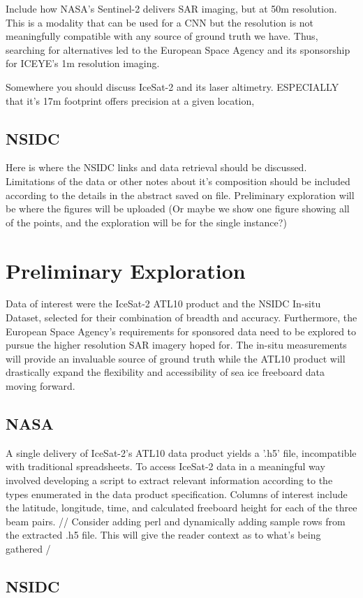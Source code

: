 Include how NASA's Sentinel-2 delivers SAR imaging, but at 50m resolution. This is a modality that can be used for a CNN but the resolution is not meaningfully compatible with any source of ground truth we have. Thus, searching for alternatives led to the European Space Agency and its sponsorship for ICEYE's 1m resolution imaging.

Somewhere you should discuss IceSat-2 and its laser altimetry. ESPECIALLY that it's 17m footprint offers precision at a given location, 
\subsection*{NSIDC}
Here is where the NSIDC links and data retrieval should be discussed. Limitations of the data or other notes about it's composition should be included according to the details in the abstract saved on file. Preliminary exploration will be where the figures will be uploaded (Or maybe we show one figure showing all of the points, and the exploration will be for the single instance?)

\section {Preliminary Exploration}
Data of interest were the IceSat-2 ATL10 product and the NSIDC In-situ Dataset, selected for their combination of breadth and accuracy. Furthermore, the European Space Agency's requirements for sponsored data need to be explored to pursue the higher resolution SAR imagery hoped for. The in-situ measurements will provide an invaluable source of ground truth while the ATL10 product will drastically expand the flexibility and accessibility of sea ice freeboard data moving forward.

\subsection*{NASA}
A single delivery of IceSat-2's ATL10 data product yields a '.h5' file, incompatible with traditional spreadsheets. To access IceSat-2 data in a meaningful way involved developing a script to extract relevant information according to the types enumerated in the data product specification. Columns of interest include the latitude, longitude, time, and calculated freeboard height for each of the three beam pairs.
// Consider adding perl and dynamically adding sample rows from the extracted .h5 file. This will give the reader context as to what's being gathered /
\subsection*{NSIDC}
